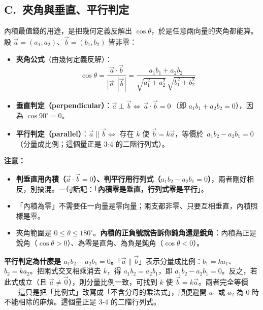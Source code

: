 \documentclass[11pt]{article}
\begin{document}
\subsection*{\sffamily C.\ 夾角與垂直、平行判定}

內積最值錢的用途，是把幾何定義反解出 $\cos\theta$，於是任意兩向量的夾角都能算。設 $\vec a=(a_1,a_2)$、$\vec b=(b_1,b_2)$ 皆非零：

\begin{itemize}\setlength{\itemsep}{2pt}
\item \textbf{夾角公式}（由幾何定義反解）：
$$\boxed{\;\cos\theta=\frac{\vec a\cdot\vec b}{|\vec a|\,|\vec b|}=\frac{a_1 b_1+a_2 b_2}{\sqrt{a_1^2+a_2^2}\,\sqrt{b_1^2+b_2^2}}\;}$$
\item \textbf{垂直判定（perpendicular）}：$\vec a\perp\vec b \iff \boxed{\,\vec a\cdot\vec b=0\,}$（即 $a_1b_1+a_2b_2=0$），因為 $\cos90^\circ=0$。
\item \textbf{平行判定（parallel）}：$\vec a\parallel\vec b \iff$ 存在 $k$ 使 $\vec b=k\vec a$，等價於 $\boxed{\,a_1 b_2-a_2 b_1=0\,}$（分量成比例；這個量正是 3-4 的二階行列式）。
\end{itemize}

\textbf{注意：}
\begin{itemize}\setlength{\itemsep}{1pt}
\item \textbf{判垂直用內積（$\vec a\cdot\vec b=0$）、判平行用行列式（$a_1b_2-a_2b_1=0$）}，兩者剛好相反，別搞混。一句話記：「\textbf{內積零是垂直，行列式零是平行}」。
\item 「內積為零」不需要任一向量是零向量；兩支都非零、只要互相垂直，內積照樣是零。
\item 夾角範圍是 $0\le\theta\le180^\circ$。\textbf{內積的正負號就告訴你鈍角還是銳角}：內積為正是銳角（$\cos\theta>0$）、為零是直角、為負是鈍角（$\cos\theta<0$）。
\end{itemize}

\textbf{平行判定為什麼是 $a_1b_2-a_2b_1=0$。}「$\vec a\parallel\vec b$」表示分量成比例：$b_1=ka_1$、$b_2=ka_2$。把兩式交叉相乘消去 $k$，得 $a_1b_2=a_2b_1$，即 $a_1b_2-a_2b_1=0$。反之，若此式成立（且 $\vec a\ne\vec 0$），則分量比例一致，可找到 $k$ 使 $\vec b=k\vec a$。兩者完全等價——這只是把「比例式」改寫成「不含分母的乘法式」，順便避開 $a_1$ 或 $a_2$ 為 $0$ 時不能相除的麻煩。這個量正是 3-4 的二階行列式。

\end{document}
